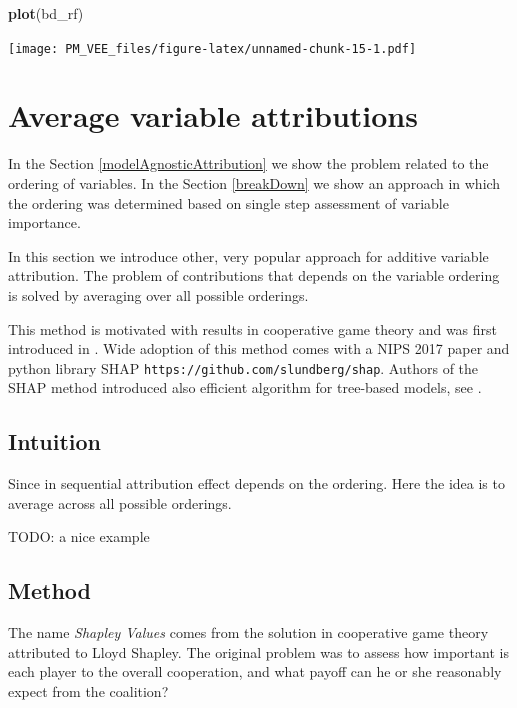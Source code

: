 \documentclass[]{krantz}
\newenvironment{Shaded}{\begin{snugshade}}{\end{snugshade}}
\newcommand{\KeywordTok}[1]{\textcolor[rgb]{0.13,0.29,0.53}{\textbf{#1}}}
\newcommand{\NormalTok}[1]{#1}
\theoremstyle{definition}
\theoremstyle{definition}
\theoremstyle{definition}
\theoremstyle{remark}
\begin{document}
\begin{Shaded}
\begin{Highlighting}[]
\KeywordTok{plot}\NormalTok{(bd_rf) }
\end{Highlighting}
\end{Shaded}

\texttt{[image: PM\_VEE\_files/figure-latex/unnamed-chunk-15-1.pdf]}

\hypertarget{shapley}{%
\section{Average variable attributions}\label{shapley}}

In the Section \ref{modelAgnosticAttribution} we show the problem
related to the ordering of variables. In the Section \ref{breakDown} we
show an approach in which the ordering was determined based on single
step assessment of variable importance.

In this section we introduce other, very popular approach for additive
variable attribution. The problem of contributions that depends on the
variable ordering is solved by averaging over all possible orderings.

This method is motivated with results in cooperative game theory and was
first introduced in \citep{Strumbelj2014}. Wide adoption of this method
comes with a NIPS 2017 paper \citep{SHAP} and python library SHAP
\texttt{https://github.com/slundberg/shap}. Authors of the SHAP method
introduced also efficient algorithm for tree-based models, see
\citep{TreeSHAP}.

\hypertarget{intuition-3}{%
\subsection{Intuition}\label{intuition-3}}

Since in sequential attribution effect depends on the ordering. Here the
idea is to average across all possible orderings.

TODO: a nice example

\hypertarget{method-3}{%
\subsection{Method}\label{method-3}}

The name \emph{Shapley Values} comes from the solution in cooperative
game theory attributed to Lloyd Shapley. The original problem was to
assess how important is each player to the overall cooperation, and what
payoff can he or she reasonably expect from the coalition?
\citep{shapleybook1952}
\end{document}

